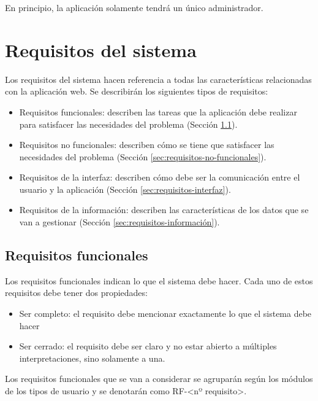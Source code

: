 En principio, la aplicación solamente tendrá un único administrador.

\section{Requisitos del sistema}\label{sec:requisitos-del-sistema}

Los requisitos del sistema hacen referencia a todas las características relacionadas con la aplicación web. Se describirán los siguientes tipos de requisitos:
\begin{itemize}
    \item Requisitos funcionales: describen las tareas que la aplicación debe realizar para satisfacer las necesidades del problema (Sección \ref{sec:requisitos-funcionales}).
    \item Requisitos no funcionales: describen cómo se tiene que satisfacer las necesidades del problema  (Sección \ref{sec:requisitos-no-funcionales}).
    \item Requisitos de la interfaz: describen cómo debe ser la comunicación entre el usuario y la aplicación  (Sección \ref{sec:requisitos-interfaz}).
    \item Requisitos de la información: describen las características de los datos que se van a gestionar (Sección \ref{sec:requisitos-información}).
\end{itemize}


\subsection{Requisitos funcionales}\label{sec:requisitos-funcionales}

Los requisitos funcionales indican lo que el sistema debe hacer. Cada uno de estos requisitos debe tener dos propiedades: 
\begin{itemize}
    \item Ser completo: el requisito debe mencionar exactamente lo que el sistema debe hacer
    \item Ser cerrado: el requisito debe ser claro y no estar abierto a múltiples interpretaciones, sino solamente a una.
\end{itemize}

Los requisitos funcionales que se van a considerar se agruparán según los módulos de los tipos de usuario y se denotarán como RF-<nº requisito>.

